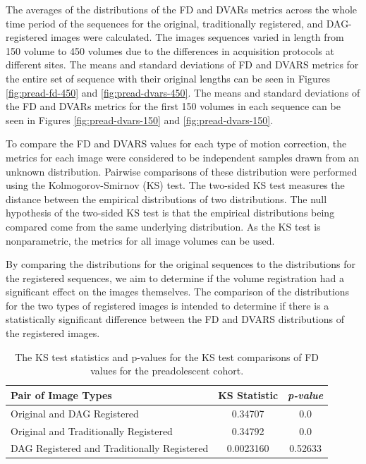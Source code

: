 The averages of the distributions of the FD and DVARs metrics across the whole time period of the sequences for the original, traditionally registered, and DAG-registered images were calculated. The images sequences varied in length from 150 volume to 450 volumes due to the differences in acquisition protocols at different sites. The means and standard deviations of FD and DVARS metrics for the entire set of sequence with their original lengths can be seen in Figures \ref{fig:pread-fd-450} and \ref{fig:pread-dvars-450}. The means and standard deviations of the FD and DVARs metrics for the first 150 volumes in each sequence can be seen in Figures \ref{fig:pread-dvars-150} and \ref{fig:pread-dvars-150}. 

To compare the FD and DVARS values for each type of motion correction, the metrics for each image were considered to be independent samples drawn from an unknown distribution. Pairwise comparisons of these distribution were performed using the Kolmogorov-Smirnov (KS) test. The two-sided KS test measures the distance between the empirical distributions of two distributions. The null hypothesis of the two-sided KS test is that the empirical distributions being compared come from the same underlying distribution. As the KS test is nonparametric, the metrics for all image volumes can be used.

By comparing the distributions for the original sequences to the distributions for the registered sequences, we aim to determine if the volume registration had a significant effect on the images themselves. The comparison of the distributions for the two types of registered images is intended to determine if there is a statistically significant difference between the FD and DVARS distributions of the registered images.

\begin{table}[]
\begin{tabular}{|l|c|c|}
\caption{The KS test statistics and p-values for the KS test comparisons of FD values for the preadolescent cohort.}
\label{tab:pread-ks-fd}
\hline
\textbf{Pair of Image Types} & \multicolumn{1}{l|}{\textbf{KS Statistic}} & \multicolumn{1}{l|}{\textit{\textbf{p-value}}} \\ \hline
Original and DAG Registered                 & 0.34707   & 0.0     \\ \hline
Original and Traditionally Registered       & 0.34792   & 0.0     \\ \hline
DAG Registered and Traditionally Registered & 0.0023160 & 0.52633 \\ \hline
\end{tabular}
\end{table}

